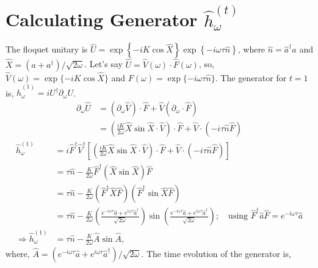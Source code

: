 \documentclass[amsmath,nobibnotes,aps,amssymb,pra, prl,aps,showpacs,superscriptaddress,twocolumn, longbibliography, reprint]{revtex4-2}
\begin{document}
\section{Calculating Generator $\hat{h}^{(t)}_{\omega}$}
\label{appendix:a}
The floquet unitary is $\hat{U} = \exp\left\{{-iK \cos{\hat{X}}}\right\}\exp\left\{{-i\omega\tau \hat{n}}\right\}$, where $\hat{n} = \hat{a}^\dagger a$ and $\hat{X} = (a+a^\dagger)/\sqrt{2\omega}$. Let's say $\hat{U} = \hat{V}(\omega)\cdot\hat{F}(\omega)$, so, $\hat{V}(\omega) = \exp\{{-iK \cos{\hat{X}}}\}$ and $F(\omega) = \exp\{{-i\omega\tau \hat{n}}\}$. The generator for $t=1$ is, $\hat{h}^{(1)}_{\omega} = iU^\dagger \partial_\omega U$.
\begin{equation}
    \label{eq:apx_du}
    \begin{split}
        \partial_\omega \hat{U} & = (\partial_\omega \hat{V})\cdot \hat{F} + \hat{V} (\partial_\omega \cdot \hat{F})\\
        & = \left( \frac{iK}{2\omega}\hat{X}\sin{\hat{X}}\cdot\hat{V}\right)\cdot \hat{F} + \hat{V}\cdot \left( -i\tau \hat{n}\hat{F} \right)
    \end{split}
\end{equation}
\begin{equation}
    \label{eq:apx_hhat}
    \begin{split}
        \hat{h}^{(1)}_{\omega} & = i\hat{F}^\dagger \hat{V}^\dagger \left[ \left( \frac{iK}{2\omega} \hat{X}\sin{\hat{X}}\cdot\hat{V}\right)\cdot \hat{F} + \hat{V}\cdot \left( -i\tau \hat{n}\hat{F} \right) \right]\\
         & = \tau \hat{n} -\frac{K}{2\omega}\hat{F}^\dagger \left( \hat{X}\sin{\hat{X}}\right)\hat{F} \\
        & =  \tau \hat{n} - \frac{K}{2\omega}(\hat{F}^\dagger \hat{X}\hat{F})(\hat{F}^\dagger \sin{\hat{X}}\hat{F})\\
        & = \tau \hat{n} - \frac{K}{2\omega} \left(\frac{e^{-i\omega\tau}\hat{a}+e^{i\omega\tau}\hat{a}^\dagger}{\sqrt{2\omega}}\right)\sin{\left(\frac{e^{-i\omega\tau}\hat{a}+e^{i\omega\tau}\hat{a}^\dagger}{\sqrt{2\omega}}\right)}; \quad \text{using } \hat{F}^\dagger\hat{a}\hat{F} = e^{-i\omega \tau}\hat{a}\\
        \Rightarrow \hat{h}^{(1)}_{\omega} & = \tau \hat{n} - \frac{K}{2\omega} \hat{A}\sin{\hat{A}},
    \end{split}
\end{equation}
where, $\hat{A} = (e^{-i\omega\tau}\hat{a}+e^{i\omega\tau}\hat{a}^\dagger)/\sqrt{2\omega}$. The time evolution of the generator is,
\end{document}
